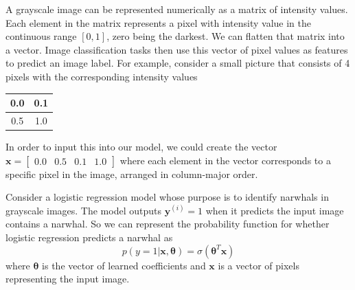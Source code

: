 \documentclass[11pt,addpoints,answers]{exam}
\newcommand{\xv}{\mathbf{x}}
\newcommand{\yv}{\mathbf{y}}
\newcommand{\thetav     }{\boldsymbol \theta     }
\newcommand{\sall}{\textbf{Select all that apply: }}
\begin{document}
\begin{questions}
A grayscale image can be represented numerically as a matrix of intensity values. Each element in the matrix represents a pixel with intensity value in the continuous range $[0,1]$, zero being the darkest. We can flatten that matrix into a vector. Image classification tasks then use this vector of pixel values as features to predict an image label.  
For example, consider a small picture that consists of 4 pixels with the corresponding intensity values \begin{center}
\begin{tabular}{ |c|c| }
 \hline
 0.0 & 0.1 \\ 
 \hline 0.5 & 1.0\\
 \hline
\end{tabular}
\end{center}
In order to input this into our model, we could create the vector $\xv = \begin{bmatrix}0.0 & 0.5 & 0.1 & 1.0 \end{bmatrix}$ where each element in the vector corresponds to a specific pixel in the image, arranged in column-major order.



Consider a logistic regression model whose purpose is to identify narwhals in grayscale images. The model outputs $\yv^{(i)} = 1$ when it predicts the input image contains a narwhal. So we can represent the probability function for whether logistic regression predicts a narwhal as 
$$p(y=1|\xv, \thetav) = \sigma(\thetav^T\xv)$$
where $\thetav$ is the vector of learned coefficients and $\xv$ is a vector of pixels representing the input image. 
\end{questions}
\end{document}
